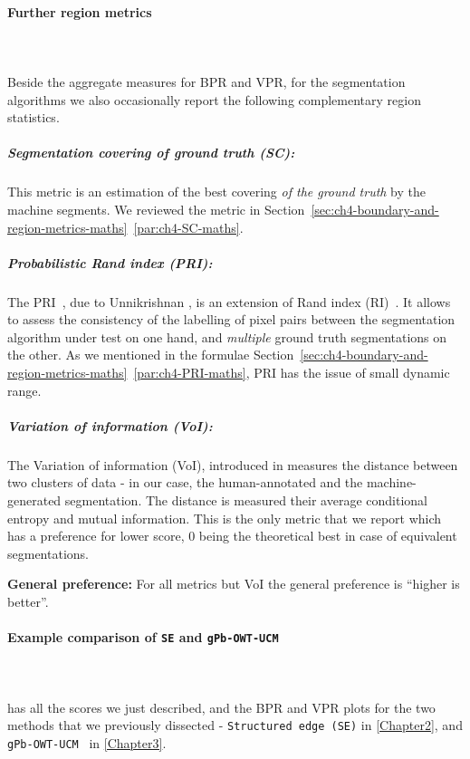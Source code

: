 \paragraph{Further region metrics}\mbox{}\\\mbox{}\\
Beside the aggregate measures for BPR and VPR, for the segmentation algorithms we also occasionally report the following complementary %
region statistics. %
\subparagraph{Segmentation covering of ground truth (SC):} This metric is an estimation of the best covering {\it of the ground truth} by the machine segments. We reviewed the metric in Section~\ref*{sec:ch4-boundary-and-region-metrics-maths}~\ref{par:ch4-SC-maths}.

\subparagraph{Probabilistic Rand index (PRI):} The PRI~\cite{UnnikrishnanPH07}, due to Unnikrishnan \etal, is an extension of Rand index (RI)~\cite{rand1971objective}. It allows to assess the consistency of the labelling of pixel pairs between the segmentation algorithm under test on one hand, and {\it multiple} ground truth segmentations on the other. %
As we mentioned in the formulae Section~\ref*{sec:ch4-boundary-and-region-metrics-maths}~\ref{par:ch4-PRI-maths}, PRI has the issue %
of small dynamic range.

\subparagraph{Variation of information (VoI):} The Variation of information (VoI), introduced in \cite{Meila05} measures the distance between two clusters of data - in our case, the human-annotated and the machine-generated segmentation. The distance is measured \wrt %
their average conditional entropy and mutual information. This is the only metric that we report which has a preference for lower score, 0 being the theoretical best in case of equivalent segmentations.

\textbf{General preference:} For all metrics but VoI the general preference is ``higher is better''.

\paragraph*{Example comparison of {\tt SE} and {\tt gPb-OWT-UCM}}\mbox{}\\\mbox{}\\
 has all the scores we just described, and  the BPR and VPR plots for the two methods that we previously dissected - {\tt Structured edge (SE)} \cite{DollarICCV13edges} in \cref{Chapter2}, and {\tt gPb-OWT-UCM}~\cite{Arbelaez11} in \cref{Chapter3}. 

